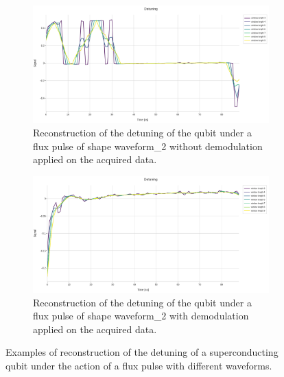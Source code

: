 \begin{figure}[h!]
    \begin{subfigure}[t]{0.495\textwidth}
        \includegraphics[width=\textwidth]{figures/png/Cryoscope/no_demod/long/detuning_windows.png}
        \caption{Reconstruction of the detuning of the qubit under a flux pulse of shape waveform\_2 without demodulation applied on the acquired data.}
        \label{fig:detuning:long_no_dem}
    \end{subfigure}
    \hfill
    \begin{subfigure}[t]{0.495\textwidth}
        \includegraphics[width=\textwidth]{figures/png/Cryoscope/demodulation/long/detuning_windows.png}
        \caption{Reconstruction of the detuning of the qubit under a flux pulse of shape waveform\_2 with demodulation applied on the acquired data.}
        \label{fig:detuning:long_dem}
    \end{subfigure}

    \caption{Examples of reconstruction of the detuning of a superconducting qubit under the action of a flux pulse with different waveforms.}
    \label{fig:detuning}
\end{figure}

